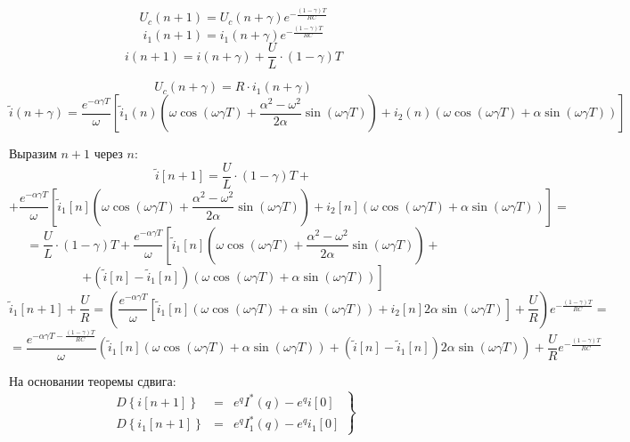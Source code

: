 \documentclass[a4paper,12pt]{article}
\begin{document}
$$
U_c(n+1) = U_c(n+\gamma) e^{-\frac{(1-\gamma)T}{RC}}
$$
$$
i_1(n+1) = i_1(n+\gamma) e^{-\frac{(1-\gamma)T}{RC}}
$$
$$
i(n+1) = i(n+\gamma) + \frac{U}{L}\cdot (1-\gamma)T
$$

$$
U_c(n+\gamma) = R\cdot i_1(n+\gamma)
$$
$$
\tilde{i}(n+\gamma) = \frac{e^{-\alpha\gamma T}}{\omega} 
\left[
\tilde{i}_1(n)\left(\omega\cos(\omega\gamma T) + \frac{\alpha^2 - \omega^2}{2\alpha}\sin(\omega\gamma T) \right)
+ i_2(n)\left(\omega\cos(\omega\gamma T)  + \alpha\sin(\omega\gamma T)\right)
\right]
$$


Выразим $n+1$ через $n$:
$$
\tilde{i}[n+1] = \frac{U}{L}\cdot (1-\gamma)T +
$$
$$
+ \frac{e^{-\alpha\gamma T}}{\omega}
\left[
\tilde{i}_1[n] \left(\omega\cos(\omega\gamma T) + \frac{\alpha^2 - \omega^2}{2\alpha}\sin(\omega\gamma T) \right)
+ i_2[n]\left(\omega\cos(\omega\gamma T)  + \alpha\sin(\omega\gamma T)\right)
\right] =
$$ 
$$
= \frac{U}{L}\cdot (1-\gamma)T + \frac{e^{-\alpha\gamma T}}{\omega}
\left[
\tilde{i}_1[n]\left(\omega\cos(\omega\gamma T) + \frac{\alpha^2 - \omega^2}{2\alpha}\sin(\omega\gamma T) \right) \right. +
$$
$$
\left.
+ \left(\tilde{i}[n] - \tilde{i}_1[n]\right)\left(\omega\cos(\omega\gamma T)
+ \alpha\sin(\omega\gamma T)\right)
\right]
$$
$$
\tilde{i}_1[n+1] +\frac{U}{R} = \left(\frac{e^{-\alpha\gamma T}}{\omega} 
\left[ \tilde{i}_1[n] 
\left(\omega\cos(\omega\gamma T) + \alpha \sin(\omega\gamma T)\right)
+ i_2[n] 2\alpha\sin(\omega\gamma T) \right] + \frac{U}{R}\right) e^{-\frac{(1-\gamma)T}{RC}} =
$$ 
$$
= \frac{e^{-\alpha\gamma T -\frac{(1-\gamma)T}{RC}}}{\omega} \left( \tilde{i}_1[n] 
\left(\omega\cos(\omega\gamma T) + \alpha \sin(\omega\gamma T)\right)
+ \left(\tilde{i}[n] - \tilde{i}_1[n]\right)2\alpha\sin(\omega\gamma T) \right)
+ \frac{U}{R} e^{-\frac{(1-\gamma)T}{RC}}
$$

На основании теоремы сдвига:
$$
\left.
\begin{array}{lcl}
D\left\{i[n+1]\right\} &=& e^q I^*(q) - e^q i[0]\\[1.5mm]
D\left\{i_1[n+1]\right\} &=& e^q I_1^*(q) - e^q i_1[0]
\end{array}
\right\}
$$
\end{document}
